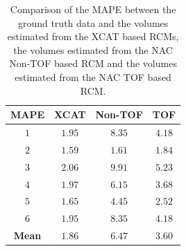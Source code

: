             \begin{table}
                \centering
                
                \captionsetup{singlelinecheck=false}
                \caption{
                    Comparison of the \gls{MAPE} between the ground truth data and the volumes estimated from the \gls{XCAT} based \glspl{RCM}, the volumes estimated from the \gls{NAC} \gls{Non-TOF} based \gls{RCM} and the volumes estimated from the \gls{NAC} \gls{TOF} based \gls{RCM}.
                }
                
                \resizebox*{1.0\linewidth}{!}
                {
                    \begin{tabular}{||c|ccc||}
                        \hline
                        \textbf{\gls{MAPE}} & \textbf{XCAT}     & \textbf{\gls{Non-TOF}}    & \textbf{\gls{TOF}} \\
                        \hline
                        \textbf{$1$}        & $1.95$            & $8.35$                        & $4.18$ \\
                        \textbf{$2$}        & $1.59$            & $1.61$                        & $1.84$ \\
                        \textbf{$3$}        & $2.06$            & $9.91$                        & $5.23$ \\
                        \textbf{$4$}        & $1.97$            & $6.15$                        & $3.68$ \\
                        \textbf{$5$}        & $1.65$            & $4.45$                        & $2.52$ \\
                        \textbf{$6$}        & $1.95$            & $8.35$                        & $4.18$ \\
                        \hline
                        \textbf{Mean}       & $1.86$            & $6.47$                        & $3.60$ \\
                        \hline
                    \end{tabular}
                } \label{tab:impact_of_tof_on_respiratory_motion_model_estimation_using_pre_gated_no_intra_cycle_motion_nac_pet_results_mape}
            \end{table}
            
